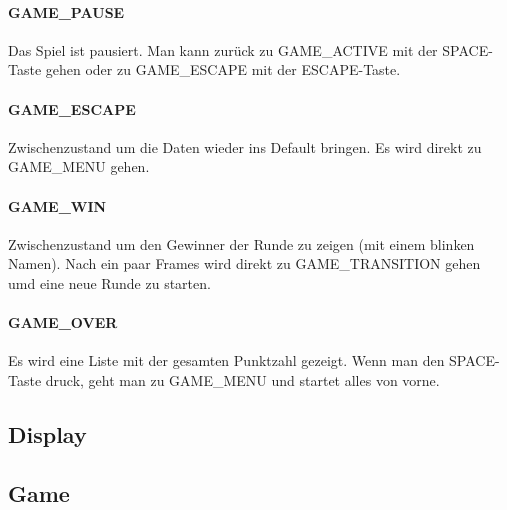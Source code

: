\documentclass[doktyp=studarbeit]{TUBAFarbeiten}
\begin{document}
\paragraph{GAME\_PAUSE}
Das Spiel ist pausiert. Man kann zurück zu GAME\_ACTIVE mit der SPACE-Taste
gehen oder zu GAME\_ESCAPE mit der ESCAPE-Taste.
\paragraph{GAME\_ESCAPE}
Zwischenzustand um die Daten wieder ins Default bringen. Es wird direkt zu 
GAME\_MENU gehen.
\paragraph{GAME\_WIN}
Zwischenzustand um den Gewinner der Runde zu zeigen (mit einem blinken Namen).
Nach ein paar Frames wird direkt zu GAME\_TRANSITION gehen umd eine neue Runde
zu starten. 
\paragraph{GAME\_OVER}
Es wird eine Liste mit der gesamten Punktzahl gezeigt. Wenn man den SPACE-Taste
druck, geht man zu GAME\_MENU und startet alles von vorne.

\subsection{Display}

\subsection{Game}
\end{document}
